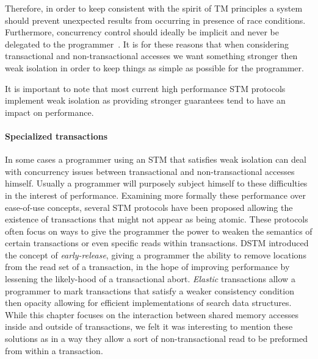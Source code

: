 Therefore, in order  to keep consistent with  the spirit of TM  principles a
system should prevent unexpected   results  from   occurring  
in presence of  race conditions. 
Furthermore, concurrency   control should  ideally be implicit  
and never be delegated to  the programmer~\cite{CIR12,MS12}.
It is for these reasons that when considering transactional and non-transactional accesses
we want something stronger then weak isolation in order to keep things
as simple as possible for the programmer.

It is important to note that most current high performance STM protocols implement weak isolation
as providing stronger guarantees tend to have an impact on performance.



\paragraph{Specialized transactions}
In some cases a programmer using an STM that satisfies
weak isolation can deal with concurrency issues between transactional
and non-transactional accesses himself.
Usually a programmer will purposely subject himself to these
difficulties in the interest of performance.
Examining more formally these performance over ease-of-use concepts, several
STM protocols have been proposed allowing the existence of transactions
that might not appear as being atomic.
These protocols often focus on ways to give the programmer the power to weaken the semantics
of certain transactions or even specific reads within transactions.
DSTM \cite{HLMS03} introduced the concept of \emph{early-release}, giving a programmer
the ability to remove locations from the read set of a transaction,
in the hope of improving performance by lessening the likely-hood of a
transactional abort.
\emph{Elastic} transactions \cite{FGG09} allow a programmer to mark transactions that
satisfy a weaker consistency condition then opacity allowing for efficient
implementations of search data structures.
While this chapter focuses on the interaction between shared memory accesses
inside and outside of transactions, we felt it was interesting to mention
these solutions as in a way they allow a sort of non-transactional read
to be preformed from within a transaction.

